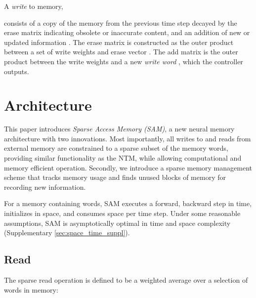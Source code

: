 \documentclass{article}
\begin{document}
A \textit{write} to memory,

consists of a copy of the memory from the previous time step  decayed by the erase matrix  indicating obsolete or inaccurate content, and an addition of new or updated information . The erase matrix  is constructed as the outer product between a set of write weights  and erase vector . The add matrix  is the outer product between the write weights and a new \textit{write word} , which the controller outputs.

























\section{Architecture}
\label{sec:architecture}

This paper introduces \textit{Sparse Access Memory (SAM)}, a new neural memory architecture with two innovations. Most importantly, all writes to and reads from external memory are constrained to a sparse subset of the memory words, providing similar functionality as the NTM, while allowing computational and memory efficient operation. Secondly, we introduce a sparse memory management scheme that tracks memory usage and finds unused blocks of memory for recording new information.

For a memory containing  words, SAM executes a forward, backward step in  time, initializes in  space, and consumes  space per time step. Under some reasonable assumptions, SAM is asymptotically optimal in time and space complexity (Supplementary \ref{sec:space_time_suppl}).

















\subsection{Read}
The sparse read operation is defined to be a weighted average over a selection of words in memory:
\end{document}
